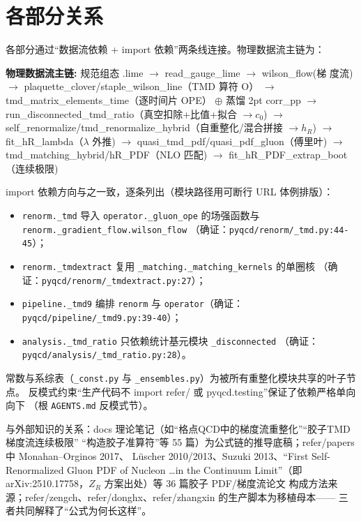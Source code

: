 \documentclass[UTF8]{ctexart}
\begin{document}
\section{各部分关系}

各部分通过``数据流依赖 + import 依赖''两条线连接。物理数据流主链为：

\begin{keybox}
\textbf{物理数据流主链:}
\textcolor{relation}{规范组态 .lime $\to$ read\_gauge\_lime $\to$ wilson\_flow(梯 度流)
$\to$ plaquette\_clover/staple\_wilson\_line（TMD 算符 O）
$\to$ tmd\_matrix\_elements\_time（逐时间片 OPE）
$\oplus$ 蒸馏 2pt corr\_pp $\to$ run\_disconnected\_tmd\_ratio（真空扣除+比值+拟合 $\to c_0$)
$\to$ self\_renormalize/tmd\_renormalize\_hybrid（自重整化/混合拼接 $\to h_R$)
$\to$ fit\_hR\_lambda（$\lambda$ 外推) $\to$ quasi\_tmd\_pdf/quasi\_pdf\_gluon（傅里叶)
$\to$ tmd\_matching\_hybrid/hR\_PDF（NLO 匹配) $\to$ fit\_hR\_PDF\_extrap\_boot（连续极限)}
\end{keybox}

import 依赖方向与之一致，逐条列出（模块路径用可断行 URL 体例排版）：

\begin{itemize}
\item \texttt{\nolinkurl{renorm._tmd}} 导入 \texttt{\nolinkurl{operator._gluon_ope}}
的场强函数与 \texttt{\nolinkurl{renorm._gradient_flow.wilson_flow}}
（确证：\texttt{\nolinkurl{pyqcd/renorm/_tmd.py:44-45}}）；
\item \texttt{\nolinkurl{renorm._tmdextract}} 复用
\texttt{\nolinkurl{_matching._matching_kernels}} 的单圈核
（确证：\texttt{\nolinkurl{pyqcd/renorm/_tmdextract.py:27}}）；
\item \texttt{\nolinkurl{pipeline._tmd9}} 编排 \texttt{renorm} 与
\texttt{operator}（确证：\texttt{\nolinkurl{pyqcd/pipeline/_tmd9.py:39-40}}）；
\item \texttt{\nolinkurl{analysis._tmd_ratio}} 只依赖统计基元模块
\texttt{\nolinkurl{_disconnected}}
（确证：\texttt{\nolinkurl{pyqcd/analysis/_tmd_ratio.py:28}}）。
\end{itemize}

常数与系综表（\texttt{\nolinkurl{_const.py}} 与
\texttt{\nolinkurl{_ensembles.py}}）为被所有重整化模块共享的叶子节点。
反模式约束``生产代码不 import refer/ 或 pyqcd.testing''保证了依赖严格单向向下
（根 \texttt{\nolinkurl{AGENTS.md}} 反模式节）。

与外部知识的关系：docs 理论笔记（如``格点QCD中的梯度流重整化''``胶子TMD梯度流连续极限''
``构造胶子准算符''等 55 篇）为公式链的推导底稿；refer/papers 中 Monahan--Orginos 2017、
L\"uscher 2010/2013、Suzuki 2013、``First Self-Renormalized Gluon PDF of Nucleon \ldots in
the Continuum Limit''（即 arXiv:2510.17758，$Z_R$ 方案出处）等 36 篇胶子 PDF/梯度流论文
构成方法来源；refer/zengch、refer/donghx、refer/zhangxin 的生产脚本为移植母本——
三者共同解释了``公式为何长这样''。
\end{document}

